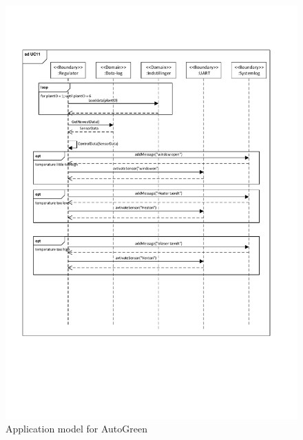 \begin{figure}[!h]
\centering 
\includegraphics[width={\textwidth-1cm}, trim=0 0 0 0, clip=true]{../fig/SD_autogreen_UC_11_regulering.pdf}
\caption{Application model for AutoGreen}
\label{fig:SD_UC11}
\end{figure}

\clearpage